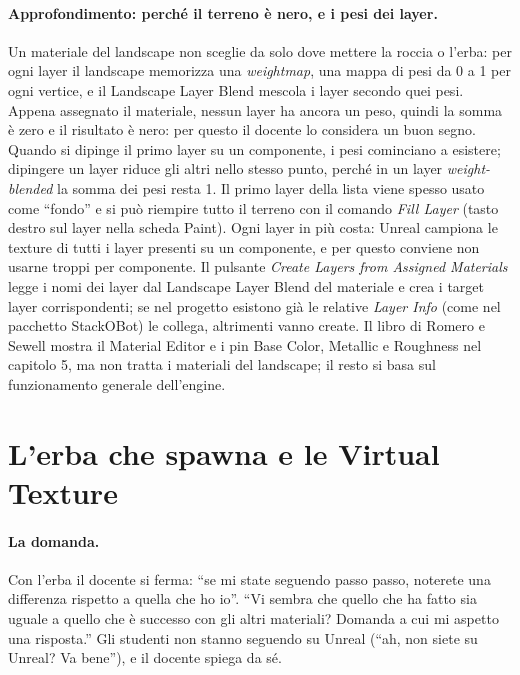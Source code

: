 \paragraph{Approfondimento: perché il terreno è nero, e i pesi dei layer.} Un materiale del
landscape non sceglie da solo dove mettere la roccia o l'erba: per ogni layer il landscape
memorizza una \emph{weightmap}, una mappa di pesi da 0 a 1 per ogni vertice, e il Landscape
Layer Blend mescola i layer secondo quei pesi. Appena assegnato il materiale, nessun layer
ha ancora un peso, quindi la somma è zero e il risultato è nero: per questo il docente lo
considera un buon segno. Quando si dipinge il primo layer su un componente, i pesi
cominciano a esistere; dipingere un layer riduce gli altri nello stesso punto, perché in un
layer \emph{weight-blended} la somma dei pesi resta 1. Il primo layer della lista viene
spesso usato come ``fondo'' e si può riempire tutto il terreno con il comando \emph{Fill
Layer} (tasto destro sul layer nella scheda Paint). Ogni layer in più costa: Unreal campiona
le texture di tutti i layer presenti su un componente, e per questo conviene non usarne
troppi per componente. Il pulsante \emph{Create Layers from Assigned Materials} legge i
nomi dei layer dal Landscape Layer Blend del materiale e crea i target layer
corrispondenti; se nel progetto esistono già le relative \emph{Layer Info} (come nel
pacchetto StackOBot) le collega, altrimenti vanno create. Il libro di Romero e Sewell
mostra il Material Editor e i pin Base Color, Metallic e Roughness nel capitolo 5, ma non
tratta i materiali del landscape; il resto si basa sul funzionamento generale dell'engine.

\section{L'erba che spawna e le Virtual Texture}
\label{ue14:sec:grass}

\paragraph{La domanda.} Con l'erba il docente si ferma: ``se mi state seguendo passo passo,
noterete una differenza rispetto a quella che ho io''. ``Vi sembra che quello che ha fatto
sia uguale a quello che è successo con gli altri materiali? Domanda a cui mi aspetto una
risposta.'' Gli studenti non stanno seguendo su Unreal (``ah, non siete su Unreal? Va bene''),
e il docente spiega da sé.

